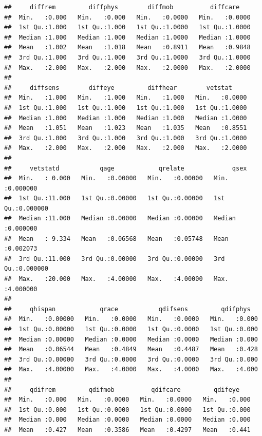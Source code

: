 \documentclass[
]{article}
\begin{document}
\begin{verbatim}
##     diffrem         diffphys        diffmob          diffcare     
##  Min.   :0.000   Min.   :0.000   Min.   :0.0000   Min.   :0.0000  
##  1st Qu.:1.000   1st Qu.:1.000   1st Qu.:1.0000   1st Qu.:1.0000  
##  Median :1.000   Median :1.000   Median :1.0000   Median :1.0000  
##  Mean   :1.002   Mean   :1.018   Mean   :0.8911   Mean   :0.9848  
##  3rd Qu.:1.000   3rd Qu.:1.000   3rd Qu.:1.0000   3rd Qu.:1.0000  
##  Max.   :2.000   Max.   :2.000   Max.   :2.0000   Max.   :2.0000  
##                                                                   
##     diffsens        diffeye         diffhear        vetstat      
##  Min.   :1.000   Min.   :1.000   Min.   :1.000   Min.   :0.0000  
##  1st Qu.:1.000   1st Qu.:1.000   1st Qu.:1.000   1st Qu.:1.0000  
##  Median :1.000   Median :1.000   Median :1.000   Median :1.0000  
##  Mean   :1.051   Mean   :1.023   Mean   :1.035   Mean   :0.8551  
##  3rd Qu.:1.000   3rd Qu.:1.000   3rd Qu.:1.000   3rd Qu.:1.0000  
##  Max.   :2.000   Max.   :2.000   Max.   :2.000   Max.   :2.0000  
##                                                                  
##     vetstatd           qage            qrelate             qsex         
##  Min.   : 0.000   Min.   :0.00000   Min.   :0.00000   Min.   :0.000000  
##  1st Qu.:11.000   1st Qu.:0.00000   1st Qu.:0.00000   1st Qu.:0.000000  
##  Median :11.000   Median :0.00000   Median :0.00000   Median :0.000000  
##  Mean   : 9.334   Mean   :0.06568   Mean   :0.05748   Mean   :0.002073  
##  3rd Qu.:11.000   3rd Qu.:0.00000   3rd Qu.:0.00000   3rd Qu.:0.000000  
##  Max.   :20.000   Max.   :4.00000   Max.   :4.00000   Max.   :4.000000  
##                                                                         
##     qhispan            qrace           qdifsens         qdifphys    
##  Min.   :0.00000   Min.   :0.0000   Min.   :0.0000   Min.   :0.000  
##  1st Qu.:0.00000   1st Qu.:0.0000   1st Qu.:0.0000   1st Qu.:0.000  
##  Median :0.00000   Median :0.0000   Median :0.0000   Median :0.000  
##  Mean   :0.06544   Mean   :0.4849   Mean   :0.4487   Mean   :0.428  
##  3rd Qu.:0.00000   3rd Qu.:0.0000   3rd Qu.:0.0000   3rd Qu.:0.000  
##  Max.   :4.00000   Max.   :4.0000   Max.   :4.0000   Max.   :4.000  
##                                                                     
##     qdifrem         qdifmob          qdifcare         qdifeye     
##  Min.   :0.000   Min.   :0.0000   Min.   :0.0000   Min.   :0.000  
##  1st Qu.:0.000   1st Qu.:0.0000   1st Qu.:0.0000   1st Qu.:0.000  
##  Median :0.000   Median :0.0000   Median :0.0000   Median :0.000  
##  Mean   :0.427   Mean   :0.3586   Mean   :0.4297   Mean   :0.441  

\end{verbatim}
\end{document}
